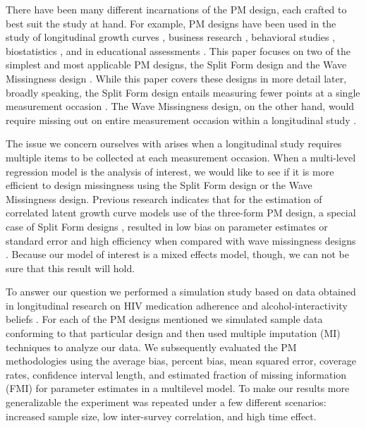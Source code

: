 \documentclass{svjour3}                     %
\begin{document}
There have been many different incarnations of the PM design, each crafted to best suit the study at hand. For example, PM designs have been used in the study of longitudinal growth curves \citep{graham2001planned, mcardle1997expanding}, business research \citep{shoemaker1973principles}, behavioral studies \citep{harel2015designed}, biostatistics \citep{andres2006partial, wacholder1994partial}, and in educational assessments \citep{zeger1997efficient, sirotnik1977incidence}. This paper focuses on two of the simplest and most applicable PM designs, the Split Form design \citep{raghunathan1995split} and the Wave Missingness design \citep{little2013planned}. While this paper covers these designs in more detail later, broadly speaking, the Split Form design entails measuring fewer points at a single measurement occasion \citep{raghunathan1995split}. The Wave Missingness design, on the other hand, would require missing out on entire measurement occasion within a longitudinal study \citep{graham2001planned}. 

The issue we concern ourselves with arises when a longitudinal study requires multiple items to be collected at each measurement occasion. When a multi-level regression model is the analysis of interest, we would like to see if it is more efficient to design missingness using the Split Form design or the Wave Missingness design. Previous research indicates that for the estimation of correlated latent growth curve models use of the three-form PM design, a special case of Split Form designs \citep{raghunathan1995split}, resulted in low bias on parameter estimates or standard error and high efficiency when compared with wave missingness designs \citep{rhemtulla2014planned}. Because our model of interest is a mixed effects model, though, we can not be sure that this result will hold. \par 

To answer our question we performed a simulation study based on data obtained in longitudinal research on HIV medication adherence and alcohol-interactivity beliefs \citep{pellowski2016alcohol}. For each of the PM designs mentioned we simulated sample data conforming to that particular design and then used multiple imputation (MI) \citep{little2014statistical}  techniques to analyze our data. We subsequently evaluated the PM methodologies using the average bias, percent bias, mean squared error, coverage rates, confidence interval length, and estimated fraction of missing information (FMI) \citep{little2014statistical} for parameter estimates in a multilevel model. To make our results more generalizable the experiment was repeated under a few different scenarios: increased sample size, low inter-survey correlation, and high time effect. \par
\end{document}
